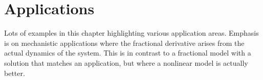 \chapter{Applications}
  \label{ch:examples}

  Lots of examples in this chapter highlighting various application areas. Emphasis is on mechanistic applications where the fractional derivative arises from the actual dynamics of the system. This is in contrast to a fractional model with a solution that matches an application, but where a nonlinear model is actually better.

